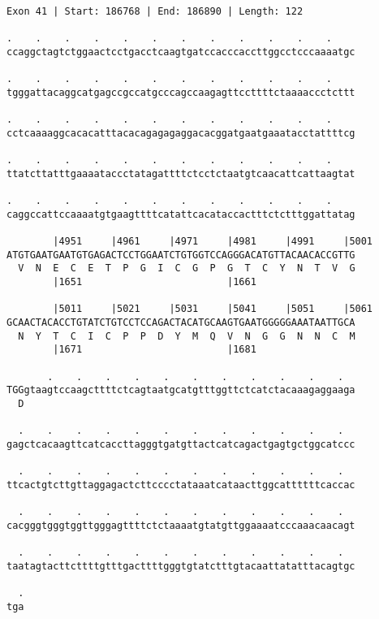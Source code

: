 \documentclass{article}
\begin{document}
\begin{Verbatim}
Exon 41 | Start: 186768 | End: 186890 | Length: 122
 
.    .    .    .    .    .    .    .    .    .    .    .    
ccaggctagtctggaactcctgacctcaagtgatccacccaccttggcctcccaaaatgc
  
.    .    .    .    .    .    .    .    .    .    .    .    
tgggattacaggcatgagccgccatgcccagccaagagttccttttctaaaaccctcttt
  
.    .    .    .    .    .    .    .    .    .    .    .    
cctcaaaaggcacacatttacacagagagaggacacggatgaatgaaatacctattttcg
  
.    .    .    .    .    .    .    .    .    .    .    .    
ttatcttatttgaaaataccctatagattttctcctctaatgtcaacattcattaagtat
  
.    .    .    .    .    .    .    .    .    .    .    .    
caggccattccaaaatgtgaagttttcatattcacataccactttctctttggattatag
  
        |4951     |4961     |4971     |4981     |4991     |5001
ATGTGAATGAATGTGAGACTCCTGGAATCTGTGGTCCAGGGACATGTTACAACACCGTTG
  V  N  E  C  E  T  P  G  I  C  G  P  G  T  C  Y  N  T  V  G
        |1651                         |1661                 
  
        |5011     |5021     |5031     |5041     |5051     |5061
GCAACTACACCTGTATCTGTCCTCCAGACTACATGCAAGTGAATGGGGGAAATAATTGCA
  N  Y  T  C  I  C  P  P  D  Y  M  Q  V  N  G  G  N  N  C  M
        |1671                         |1681                 
  
       .    .    .    .    .    .    .    .    .    .    .  
TGGgtaagtccaagcttttctcagtaatgcatgtttggttctcatctacaaagaggaaga
  D                                                         
  
  .    .    .    .    .    .    .    .    .    .    .    .  
gagctcacaagttcatcaccttagggtgatgttactcatcagactgagtgctggcatccc
  
  .    .    .    .    .    .    .    .    .    .    .    .  
ttcactgtcttgttaggagactcttcccctataaatcataacttggcattttttcaccac
  
  .    .    .    .    .    .    .    .    .    .    .    .  
cacgggtgggtggttgggagttttctctaaaatgtatgttggaaaatcccaaacaacagt
  
  .    .    .    .    .    .    .    .    .    .    .    .  
taatagtacttcttttgtttgacttttgggtgtatctttgtacaattatatttacagtgc
  
  .
tga
\end{Verbatim}
\newpage
\end{document}
